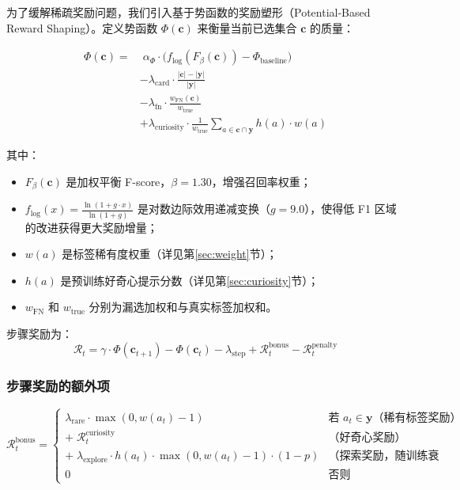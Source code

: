 \documentclass[12pt,a4paper]{article}
\newcommand{\reward}{\mathcal{R}}
\newcommand{\selected}{\mathbf{c}}
\newcommand{\trueSE}{\mathbf{y}}
\begin{document}
为了缓解稀疏奖励问题，我们引入基于势函数的奖励塑形（Potential-Based Reward Shaping）。定义势函数 $\Phi(\selected)$ 来衡量当前已选集合 $\selected$ 的质量：

\begin{equation}
\begin{aligned}
\Phi(\selected) = &\;\alpha_{\Phi} \cdot \Big(f_{\text{log}}(F_{\beta}(\selected)) - \Phi_{\text{baseline}}\Big) \\
& - \lambda_{\text{card}} \cdot \frac{|\selected| - |\trueSE|}{|\trueSE|} \\
& - \lambda_{\text{fn}} \cdot \frac{w_{\text{FN}}(\selected)}{w_{\text{true}}} \\
& + \lambda_{\text{curiosity}} \cdot \frac{1}{w_{\text{true}}} \sum_{a \in \selected \cap \trueSE} h(a) \cdot w(a)
\end{aligned}
\end{equation}

其中：
\begin{itemize}
    \item $F_{\beta}(\selected)$ 是加权平衡 F-score，$\beta = 1.30$，增强召回率权重；
    \item $f_{\text{log}}(x) = \frac{\ln(1 + g \cdot x)}{\ln(1 + g)}$ 是对数边际效用递减变换（$g = 9.0$），使得低 F1 区域的改进获得更大奖励增量；
    \item $w(a)$ 是标签稀有度权重（详见第\ref{sec:weight}节）；
    \item $h(a)$ 是预训练好奇心提示分数（详见第\ref{sec:curiosity}节）；
    \item $w_{\text{FN}}$ 和 $w_{\text{true}}$ 分别为漏选加权和与真实标签加权和。
\end{itemize}

步骤奖励为：
\begin{equation}
    \reward_t = \gamma \cdot \Phi(\selected_{t+1}) - \Phi(\selected_t) - \lambda_{\text{step}} + \reward_t^{\text{bonus}} - \reward_t^{\text{penalty}}
\end{equation}

\subsubsection{步骤奖励的额外项}

\begin{equation}
\reward_t^{\text{bonus}} = 
\begin{cases}
    \lambda_{\text{rare}} \cdot \max(0, w(a_t)-1) & \text{若 } a_t \in \trueSE \text{（稀有标签奖励）} \\
    + \; \reward_t^{\text{curiosity}} & \text{（好奇心奖励）} \\
    + \; \lambda_{\text{explore}} \cdot h(a_t) \cdot \max(0, w(a_t)-1) \cdot (1-p) & \text{（探索奖励，随训练衰减）} \\[6pt]
    0 & \text{否则}
\end{cases}
\end{equation}
\end{document}
